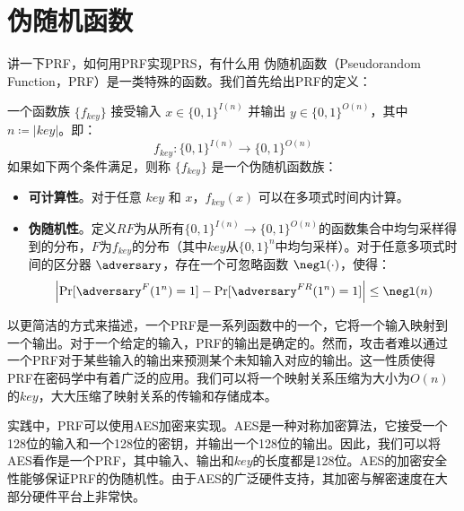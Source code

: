 \section{伪随机函数}
{讲一下PRF，如何用PRF实现PRS，有什么用}
伪随机函数（Pseudorandom Function，PRF）是一类特殊的函数。我们首先给出PRF的定义：
\begin{definition}[伪随机函数族]
    一个函数族 $\{f_{key}\}$ 接受输入 $x\in\{0,1\}^{I(n)}$ 并输出 $y\in\{0,1\}^{O(n)}$，其中 $n \coloneqq |key|$。即：
    $$ f_{key}: \{0,1\}^{I(n)} \rightarrow \{0,1\}^{O(n)}$$
    如果如下两个条件满足，则称 $\{f_{key}\}$ 是一个伪随机函数族：
    \begin{itemize}
        \item \textbf{可计算性}。对于任意 $key$ 和 $x$，$f_{key}(x)$ 可以在多项式时间内计算。
        \item \textbf{伪随机性}。定义$RF$为从所有$\{0,1\}^{I(n)} \rightarrow \{0,1\}^{O(n)}$的函数集合中均匀采样得到的分布，$F$为$f_{key}$的分布（其中$key$从$\{0,1\}^{n}$中均匀采样）。对于任意多项式时间的区分器 $\adversary$，存在一个可忽略函数 $\negl(\cdot)$，使得：
        $$\left| \Pr[\adversary^{F}(1^n) = 1] - \Pr[\adversary^{FR}(1^n) = 1] \right| \le \negl(n)$$
    \end{itemize}
\end{definition}

以更简洁的方式来描述，一个PRF是一系列函数中的一个，它将一个输入映射到一个输出。对于一个给定的输入，PRF的输出是确定的。然而，攻击者难以通过一个PRF对于某些输入的输出来预测某个未知输入对应的输出。这一性质使得PRF在密码学中有着广泛的应用。我们可以将一个映射关系压缩为大小为$O(n)$的$key$，大大压缩了映射关系的传输和存储成本。

实践中，PRF可以使用AES加密来实现。AES是一种对称加密算法，它接受一个128位的输入和一个128位的密钥，并输出一个128位的输出。因此，我们可以将AES看作是一个PRF，其中输入、输出和$key$的长度都是128位。AES的加密安全性能够保证PRF的伪随机性。由于AES的广泛硬件支持，其加密与解密速度在大部分硬件平台上非常快。